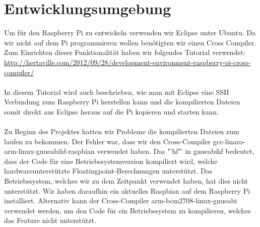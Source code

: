 \section{Entwicklungsumgebung}

Um für den Raspberry Pi zu entwickeln verwenden wir Eclipse unter Ubuntu. Da wir nicht auf dem Pi programmieren wollen benötigten wir einen Cross Compiler. Zum Einrichten dieser Funktionalität haben wir folgendes Tutorial verwendet:\\
\href{http://hertaville.com/2012/09/28/development-environment-raspberry-pi-cross-compiler/}{http://hertaville.com/2012/09/28/development-environment-raspberry-pi-cross-compiler/}\\
\\
In diesem Tutorial wird auch beschrieben, wie man mit Eclipse eine SSH Verbindung zum Raspberry Pi herstellen kann und die kompilierten Dateien somit direkt aus Eclipse heraus auf die Pi kopieren und starten kann.\\
\\
Zu Beginn des Projektes hatten wir Probleme die kompilierten Dateien zum laufen zu bekommen. Der Fehler war, dass wir den Cross-Compiler gcc-linaro-arm-linux-gnueabihf-raspbian verwendet haben. Das "'hf"' in gnueabihf bedeutet, dass der Code für eine Betriebssystemversion kompiliert wird, welche hardwareunterstützte Floatingpoint-Berechnungen unterstützt. Das Betriebssystem, welches wir zu dem Zeitpunkt verwendet haben, hat dies nicht unterstützt. Wir haben daraufhin ein aktuelles Raspbian auf dem Raspberry Pi installiert. Alternativ kann der Cross-Compiler arm-bcm2708-linux-gnueabi verwendet werden, um den Code für ein Betriebssystem zu kompilieren, welches das Feature nicht unterstützt.